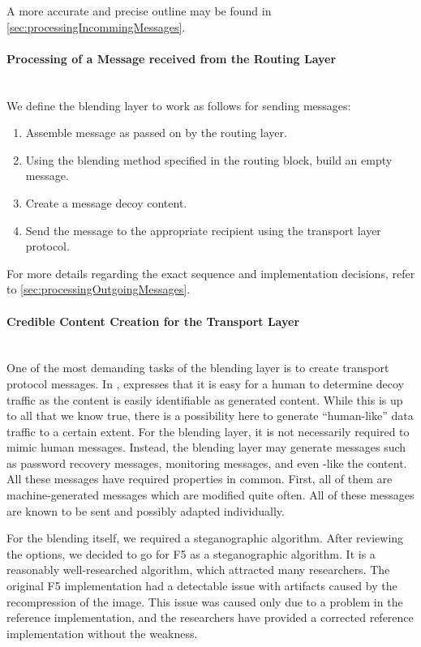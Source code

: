 A more accurate and precise outline may be found in \cref{sec:processingIncommingMessages}.

\paragraph{Processing of a Message received from the Routing Layer}~\\
We define the blending layer to work as follows for sending messages:
\begin{enumerate}
	\item Assemble message as passed on by the routing layer.
	\item Using the blending method specified in the routing block, build an empty message. 
	\item Create a message decoy content.
	\item Send the message to the appropriate recipient using the transport layer protocol.
\end{enumerate}

For more details regarding the exact sequence and implementation decisions, refer to \cref{sec:processingOutgoingMessages}.

\paragraph{Credible Content Creation for the Transport Layer}~\\
One of the most demanding tasks of the blending layer is to create transport protocol messages. In \cite{oakland2013-parrot}, \citeauthor{oakland2013-parrot} expresses that it is easy for a human to determine decoy traffic as the content is easily identifiable as generated content. While this is up to all that we know true, there is a possibility here to generate ``human-like'' data traffic to a certain extent. For the blending layer, it is not necessarily required to mimic human messages. Instead, the blending layer may generate messages such as password recovery messages, monitoring messages, and even -like the content. All these messages have required properties in common. First, all of them are machine-generated messages which are modified quite often. All of these messages are known to be sent and possibly adapted individually. 

For the blending itself, we required a steganographic algorithm. After reviewing the options, we decided to go for F5\cite{f5} as a steganographic algorithm. It is a reasonably well-researched algorithm, which attracted many researchers. The original F5 implementation had a detectable issue with artifacts\cite{F5broken} caused by the recompression of the image. This issue was caused only due to a problem in the reference implementation, and the researchers have provided a corrected reference implementation without the weakness.

